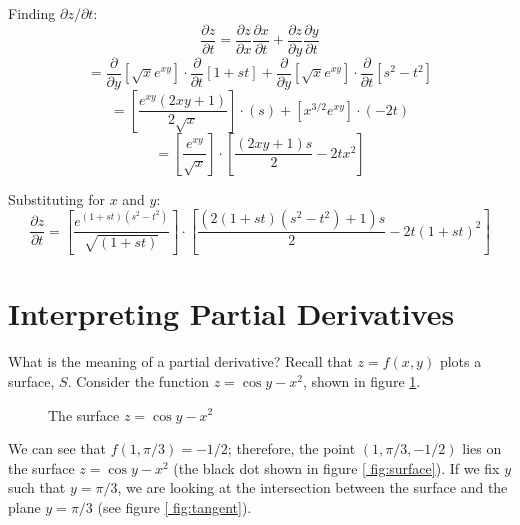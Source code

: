 \begin{Answer}[ref = chain]
\begin{enumerate}
    Finding $\partial z / \partial t$:
    $$\frac{\partial z}{\partial t} = \frac{\partial z}{\partial x} \frac{
    \partial x}{\partial t} + \frac{\partial z}{\partial y}\frac{\partial y}{
    \partial t}$$
    $$= \frac{\partial}{\partial y} \left[ \sqrt{x}e^{xy} \right] \cdot \frac{
    \partial}{\partial t} \left[ 1 + st \right] + \frac{\partial}{\partial y} 
    \left[ \sqrt{x}e^{xy} \right] \cdot \frac{\partial}{\partial t} \left[ s^2 
    - t^2 \right]$$
    $$= \left[ \frac{e^{xy} \left( 2xy + 1 \right)}{2\sqrt{x}} \right] \cdot 
    \left( s \right) + \left[ x^{3/2}e^{xy} \right] \cdot \left( -2t \right)$$
    $$= \left[ \frac{e^{xy}}{\sqrt{x}} \right] \cdot \left[ \frac{\left( 2xy + 
    1 \right)s}{2} - 2tx^2 \right]$$

    Substituting for $x$ and $y$:
    $$\frac{\partial z}{\partial t} = \left[ \frac{e^{\left( 1 + st \right) 
    \left( s^2 - t^2 \right)}}{\sqrt{\left( 1 + st \right)}} \right] \cdot 
    \left[ \frac{\left( 2\left( 1 + st \right) \left( s^2 - t^2 \right) + 1 
    \right)s}{2} - 2t \left( 1 + st \right)^2 \right]$$
\end{enumerate}
\end{Answer}

\section{Interpreting Partial Derivatives}
What is the meaning of a partial derivative? Recall that $z = f(x, y)$ plots a 
surface, $S$. Consider the function $z = \cos{y} - x^2$, shown in figure 
\ref{fig:surface}.

\begin{figure}[H]
    \centering
    \caption{The surface $z = \cos{y} - x^2$}
    \label{fig:surface}
\end{figure}

We can see that $f(1, \pi/3) = -1/2$; therefore, the point $(1, \pi/3, -1/2)$ 
lies on the surface $z = \cos{y} - x^2$ (the black dot shown in figure \ref{
fig:surface}). If we fix $y$ such that $y = \pi/3$, we are looking at the 
intersection between the surface and the plane $y = \pi/3$ (see figure \ref{
fig:tangent}). 

